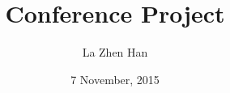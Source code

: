 \documentclass[12pt]{article}
\begin{document}
\title{Conference Project}
\author{La Zhen Han}
\date{7 November, 2015}
\maketitle

\nocite{*}



\end{document}
